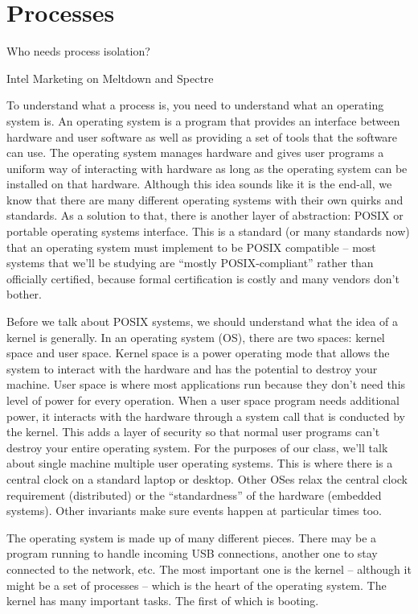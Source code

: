 \chapter{Processes}

\epigraph{Who needs process isolation?}{Intel Marketing on Meltdown and Spectre}

To understand what a process is, you need to understand what an operating system is.
An operating system is a program that provides an interface between hardware and user software as well as providing a set of tools that the software can use.
The operating system manages hardware and gives user programs a uniform way of interacting with hardware as long as the operating system can be installed on that hardware.
Although this idea sounds like it is the end-all, we know that there are many different operating systems with their own quirks and standards.
As a solution to that, there is another layer of abstraction: POSIX or portable operating systems interface.
This is a standard (or many standards now) that an operating system must implement to be POSIX compatible -- most systems that we'll be studying are ``mostly POSIX-compliant'' rather than officially certified, because formal certification is costly and many vendors don't bother.

Before we talk about POSIX systems, we should understand what the idea of a kernel is generally.
In an operating system (OS), there are two spaces: kernel space and user space.
Kernel space is a power operating mode that allows the system to interact with the hardware and has the potential to destroy your machine.
User space is where most applications run because they don't need this level of power for every operation.
When a user space program needs additional power, it interacts with the hardware through a system call that is conducted by the kernel.
This adds a layer of security so that normal user programs can't destroy your entire operating system.
For the purposes of our class, we'll talk about single machine multiple user operating systems.
This is where there is a central clock on a standard laptop or desktop.
Other OSes relax the central clock requirement (distributed) or the ``standardness'' of the hardware (embedded systems).
Other invariants make sure events happen at particular times too.

The operating system is made up of many different pieces.
There may be a program running to handle incoming USB connections, another one to stay connected to the network, etc.
The most important one is the kernel -- although it might be a set of processes -- which is the heart of the operating system.
The kernel has many important tasks.
The first of which is booting.

